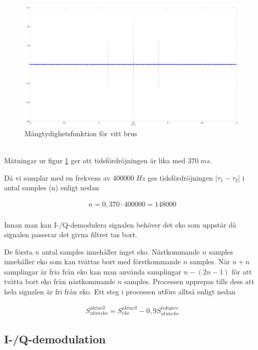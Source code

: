 \documentclass[10pt]{article}
\begin{document}
\begin{figure}[htp]
  \begin{center}
  \includegraphics[keepaspectratio=true,width=\linewidth]{xCorr.png}  %
  \end{center}
  \caption{Mångtydighetsfunktion för vitt brus} %
  \label{fig:xCorr}
\end{figure}
~\\
Mätningar ur figur \ref{fig:xCorr} ger att tidsfördröjningen är lika med $370\;ms$. 

Då vi samplar med en frekvens av $400 000\;Hz$ ges tidsfördröjningen $|\tau_1 - \tau_2|$ i antal samples (n) enligt nedan 

\begin{gather}
n = 0,370 \cdot 400 000 = 148 000
\label{equ:delaySamples}
\end{gather}
~\\
Innan man kan I-/Q-demodulera signalen behöver det eko som uppstår då signalen passerar det givna filtret tas bort. 

De första $n$ antal samples innehåller inget eko. Nästkommande $n$ samples innehåller eko som kan tvättas bort med förstkommande $n$ samples. När $n+n$ samplingar är fria från eko kan man använda samplingar $n-(2n-1)$ för att tvätta bort eko från nästkommande $n$ samples. Processen upprepas tills dess att hela signalen är fri från eko. Ett steg i processen utförs alltså enligt nedan

\begin{gather}
S_{utan eko}^{aktuell} = S_{eko}^{aktuell} - 0,9S_{utan eko}^{tidigare}
\label{equ:eko}
\end{gather}

\subsection{I-/Q-demodulation}
\end{document}

